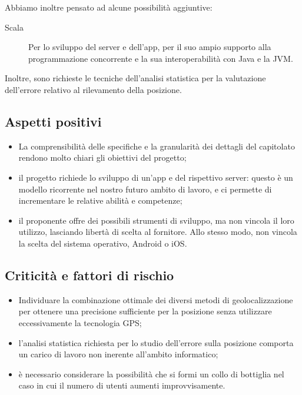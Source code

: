 \documentclass[../studio-di-fattibilita.tex]{subfiles}
\begin{document}
	Abbiamo inoltre pensato ad alcune possibilità aggiuntive:
	\begin{description}
		\item[Scala] Per lo sviluppo del server e dell'app, per il suo ampio supporto alla programmazione concorrente e la sua interoperabilità con Java e la JVM.
	\end{description}
	Inoltre, sono richieste le tecniche dell'analisi statistica per la valutazione dell'errore relativo al rilevamento della posizione.


	\subsection{Aspetti positivi}
	\label{subsec:aspetti_positivi}
	\begin{itemize}
		\item La comprensibilità delle specifiche e la granularità dei dettagli del capitolato rendono molto chiari gli obiettivi del progetto;
		\item il progetto richiede lo sviluppo di un'app e del rispettivo server: questo è un modello ricorrente nel nostro futuro ambito di lavoro, e ci permette di incrementare le relative abilità e competenze;
		\item il proponente offre dei possibili strumenti di sviluppo, ma non vincola il loro utilizzo, lasciando libertà di scelta al fornitore. Allo stesso modo, non vincola la scelta del sistema operativo, Android o iOS.
	\end{itemize}


	\subsection{Criticità e fattori di rischio}
	\label{subsec:criticita_e_fattori_di_rischio}
	\begin{itemize}
		\item Individuare la combinazione ottimale dei diversi metodi di geolocalizzazione per ottenere una precisione sufficiente per la posizione senza utilizzare eccessivamente la tecnologia GPS;
		\item l'analisi statistica richiesta per lo studio dell'errore sulla posizione comporta un carico di lavoro non inerente all'ambito informatico;
		\item è necessario considerare la possibilità che si formi un collo di bottiglia nel caso in cui il numero di utenti aumenti improvvisamente.
	\end{itemize}
\end{document}
